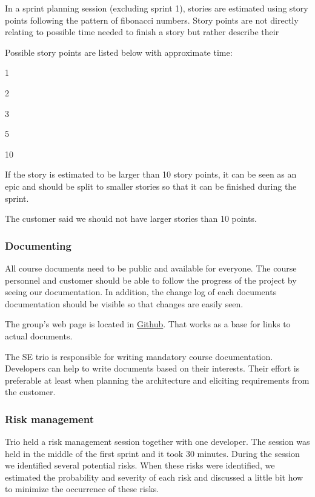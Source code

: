 In a sprint planning session (excluding sprint 1), stories are estimated using
story points following the pattern of fibonacci numbers. Story points are not
directly relating to possible time needed to finish a story but rather describe
their

Possible story points are listed below with approximate time:
\begin{description*}
\item[1]
\item[2]
\item[3]
\item[5]
\item[10]
\end{description*}
	
If the story is estimated to be larger than 10 story points, it can be seen as 
an epic and should be split to smaller stories so that it can be finished 
during the sprint.

The customer said we should not have larger stories than 10 points.

\subsubsection{Documenting}

All course documents need to be public and available for everyone. The course 
personnel and customer should be able to follow the progress of the project by 
seeing our documentation. In addition, the change log of each documents 
documentation should be visible so that changes are easily seen.

The group's web page is located in
\href{https://github.com/phyper/mobilefant-documentation/wiki}{Github}. That
works as a base for links to actual documents.

The SE trio is responsible for writing mandatory course documentation. 
Developers can help to write documents based on their interests. Their effort 
is preferable at least when planning the architecture and eliciting 
requirements from the customer. 

\subsubsection{Risk management}

Trio held a risk management session together with one developer. The session was
held in the middle of the first sprint and it took 30 minutes. During the
session we identified several potential risks. When these risks were identified,
we estimated the probability and severity of each risk and discussed a little
bit how to minimize the occurrence of these risks.

